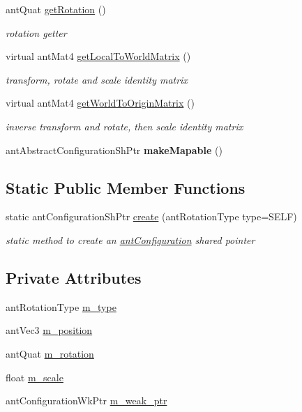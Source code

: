 \begin{DoxyCompactItemize}
ant\+Quat \hyperlink{classant_configuration_a88f393f030510d9893a7488c73332854}{get\+Rotation} ()
\begin{DoxyCompactList}\small\item\em rotation getter \end{DoxyCompactList}\item 
virtual ant\+Mat4 \hyperlink{classant_configuration_ad82e2e64fabdaf418b928c89c70cdd8a}{get\+Local\+To\+World\+Matrix} ()
\begin{DoxyCompactList}\small\item\em transform, rotate and scale identity matrix \end{DoxyCompactList}\item 
virtual ant\+Mat4 \hyperlink{classant_configuration_ac0a72cfaf4f48ee1671d917d12e5a686}{get\+World\+To\+Origin\+Matrix} ()
\begin{DoxyCompactList}\small\item\em inverse transform and rotate, then scale identity matrix \end{DoxyCompactList}\item 
\hypertarget{classant_configuration_a6edd6d57cd8f8ccb3545b91068ab5483}{ant\+Abstract\+Configuration\+Sh\+Ptr {\bfseries make\+Mapable} ()}\label{classant_configuration_a6edd6d57cd8f8ccb3545b91068ab5483}

\end{DoxyCompactItemize}
\subsection*{Static Public Member Functions}
\begin{DoxyCompactItemize}
\item 
static ant\+Configuration\+Sh\+Ptr \hyperlink{classant_configuration_a50a63e51ad01a040c130b9e729b1f47b}{create} (ant\+Rotation\+Type type=S\+E\+L\+F)
\begin{DoxyCompactList}\small\item\em static method to create an \hyperlink{classant_configuration}{ant\+Configuration} shared pointer \end{DoxyCompactList}\end{DoxyCompactItemize}
\subsection*{Private Attributes}
\begin{DoxyCompactItemize}
\item 
ant\+Rotation\+Type \hyperlink{classant_configuration_a9c6602c2995ea38583650da13b36b015}{m\+\_\+type}
\item 
ant\+Vec3 \hyperlink{classant_configuration_ab9fd2e843700f3589988064a9a2b494d}{m\+\_\+position}
\item 
ant\+Quat \hyperlink{classant_configuration_a2cd9ee51364f0481040a6c9c1faf42ac}{m\+\_\+rotation}
\item 
float \hyperlink{classant_configuration_ae1addd09ae683a014f37492aab019926}{m\+\_\+scale}
\item 
ant\+Configuration\+Wk\+Ptr \hyperlink{classant_configuration_a0ee5b6d1666f12fc211e274023780510}{m\+\_\+weak\+\_\+ptr}
\end{DoxyCompactItemize}


